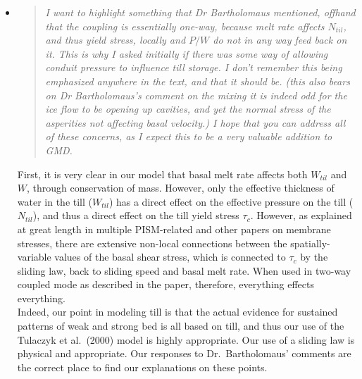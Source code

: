 \documentclass[11pt,reqno]{amsart}
\newcommand{\reply}[2]{
\medskip\medskip
\item  \begin{quote}
\emph{#1}
\end{quote}

\medskip
\noindent #2}
\begin{document}
\begin{itemize}
\reply{I want to highlight something that Dr Bartholomaus mentioned, offhand that the coupling is essentially one-way, because melt rate affects $N_{til}$, and thus yield stress, locally and $P/W$ do not in any way feed back on it.  This is why I asked initially if there was some way of allowing conduit pressure to influence till storage.  I don't remember this being emphasized anywhere in the text, and that it should be. (this also bears on Dr Bartholomaus's comment on the mixing it is indeed odd for the ice flow to be opening up cavities, and yet the normal stress of the asperities not affecting basal velocity.)  I hope that you can address all of these concerns, as I expect this to be a very valuable addition to GMD.}
{First, it is very clear in our model that basal melt rate affects both $W_{til}$ and $W$, through conservation of mass.  However, only the effective thickness of water in the till ($W_{til}$) has a direct effect on the effective pressure on the till ($N_{til}$), and thus a direct effect on the till yield stress $\tau_c$.  However, as explained at great length in multiple PISM-related and other papers on membrane stresses, there are extensive non-local connections between the spatially-variable values of the basal shear stress, which is connected to $\tau_c$ by the sliding law, back to sliding speed and basal melt rate.  When used in two-way coupled mode as described in the paper, therefore, everything effects everything.  \\
\indent Indeed, our point in modeling till is that the actual evidence for sustained patterns of weak and strong bed is all based on till, and thus our use of the Tulaczyk et al.~(2000) \cite{Tulaczyketal2000} model is highly appropriate.  Our use of a sliding law is physical and appropriate.  Our responses to Dr.~Bartholomaus' comments are the correct place to find our explanations on these points.}

\end{itemize}
\end{document}
